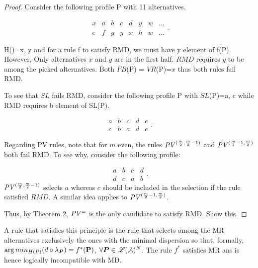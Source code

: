 \documentclass[version=3.21, pagesize, twoside=off, bibliography=totoc, DIV=calc, fontsize=12pt, a4paper]{scrartcl}
\begin{document}
\begin{proof}
Consider the following profile P with 11 alternatives.

	\begin{equation}
		\begin{array}{llllllll}
			x&a&b&c&d&y&w&\ldots \\		e&f&g&y&x&h&w&\ldots
		\end{array}.
	\end{equation}


H()={x, y} and for a rule f to satisfy RMD, we must have y element of f(P). However, Only alternatives $x$ and $y$ are in the first half. $RMD$ requires $y$ to be among the picked alternatives. Both $FB$(P) = $VR$(P)={$x$} thus both rules fail RMD. 

To see that $SL$ fails RMD, consider the following profile P with $SL$(P)={a, c} while RMD requires b element of SL(P). 


	\begin{equation}
		\begin{array}{lllll}
			a&b&c&d&e \\		c&b&a&d&e
		\end{array}.
	\end{equation}


Regarding PV rules, note that for $m$ even, the rules  $\PVv[(\frac{m}{2}, \frac{m}{2} - 1)]$ and $\PVv[(\frac{m}{2} - 1, \frac{m}{2})]$ both fail RMD. To see why, consider the following profile:

	\begin{equation}
		\begin{array}{llll}
			a&b&c&d \\		d&c&a&b
		\end{array}.
	\end{equation}
$\PVv[(\frac{m}{2}, \frac{m}{2} - 1)]$ selects $a$ whereas $c$ should be included in the selection if the rule satisfied $RMD$. A similar idea applies to $\PVv[(\frac{m}{2} - 1, \frac{m}{2})]$. 

Thus, by Theorem 2, $\mathit{PV^=}$ is the only candidate to satisfy RMD. Show this. 
\end{proof}



A rule that satisfies this principle is the rule that selects among the MR alternatives exclusively the ones with the minimal dispersion so that, formally, $ \arg min_{H(P)} (d \circ \lprof)= f^{*}(\mathbf{P})$, $\forall \bm{P} \in \mathscr{L}(\mathcal{A})^N$. The rule $f^*$ satisfies MR ans is hence logically incompatible with MD. 
\end{document}
